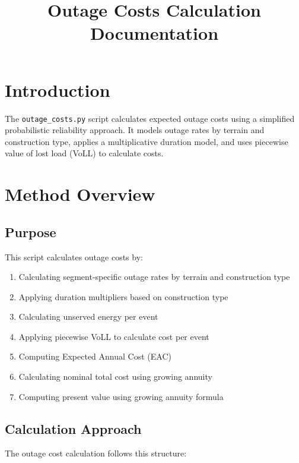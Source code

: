 \documentclass[12pt]{article}
\title{Outage Costs Calculation Documentation}
\author{}
\date{}
\begin{document}
\maketitle

\section{Introduction}

The \texttt{outage\_costs.py} script calculates expected outage costs using a simplified probabilistic reliability approach. It models outage rates by terrain and construction type, applies a multiplicative duration model, and uses piecewise value of lost load (VoLL) to calculate costs.

\section{Method Overview}

\subsection{Purpose}

This script calculates outage costs by:
\begin{enumerate}
    \item Calculating segment-specific outage rates by terrain and construction type
    \item Applying duration multipliers based on construction type
    \item Calculating unserved energy per event
    \item Applying piecewise VoLL to calculate cost per event
    \item Computing Expected Annual Cost (EAC)
    \item Calculating nominal total cost using growing annuity
    \item Computing present value using growing annuity formula
\end{enumerate}

\subsection{Calculation Approach}

The outage cost calculation follows this structure:
\end{document}
